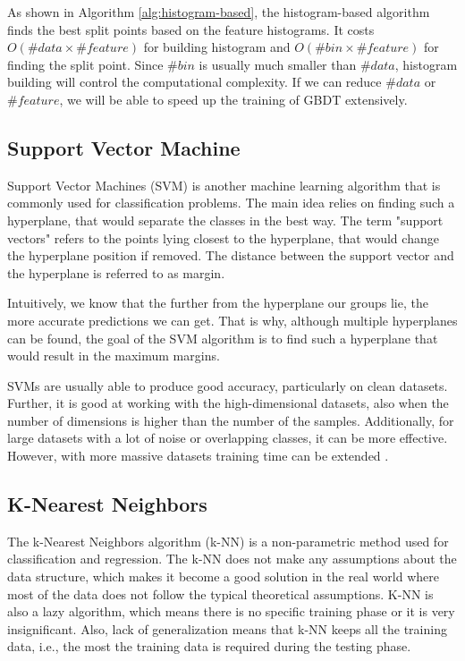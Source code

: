 As shown in Algorithm \ref{alg:histogram-based}, the histogram-based algorithm finds the best split points based on the feature histograms. 
It costs $O(\#data \times \#feature)$ for building histogram and $O(\#bin \times \#feature)$ for finding the split point. Since $\#bin$ is usually much smaller than $\#data$, histogram building will control the computational complexity. If we can reduce $\#data$ or $\#feature$, we will be able to speed up the training of GBDT extensively.

\subsection{Support Vector Machine}

Support Vector Machines (SVM) is another machine learning algorithm that is commonly used for classification problems. The main idea relies on finding such a hyperplane, that would separate the classes in the best way. The term "support vectors" refers to the points lying closest to the hyperplane, that would change the hyperplane position if removed. The distance between the support vector and the hyperplane is referred to as margin.

Intuitively, we know that the further from the hyperplane our groups lie, the more accurate predictions we can get. That is why, although multiple hyperplanes can be found, the goal of the SVM algorithm is to find such a hyperplane that would result in the maximum margins.

SVMs are usually able to produce good accuracy, particularly on clean datasets. 
Further, it is good at working with the high-dimensional datasets, also when the number of dimensions is higher than the number of the samples. 
Additionally, for large datasets with a lot of noise or overlapping classes, it can be more effective.
However, with more massive datasets training time can be extended \cite{jing2010view}.

\subsection{K-Nearest Neighbors}

The k-Nearest Neighbors algorithm (k-NN) is a non-parametric method used for classification and regression. 
The k-NN does not make any assumptions about the data structure, which makes it become a good solution in the real world where most of the data does not follow the typical theoretical assumptions. 
K-NN is also a lazy algorithm, which means there is no specific training phase or it is very insignificant. 
Also, lack of generalization means that k-NN keeps all the training data, i.e., the most the training data is required during the testing phase.

